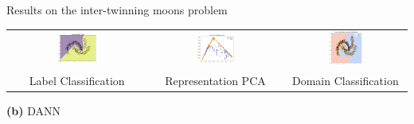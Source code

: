 \documentclass{beamer}
\begin{document}
\begin{frame}{Results on the inter-twinning moons problem}
\begin{minipage}{0.8\linewidth}
\centering
\begin{adjustbox}{max width=\textwidth}
\begin{tabular}{ccc}
\includegraphics[width=0.3\textwidth]{label_decision_dann.png} &
\includegraphics[width=0.3\textwidth]{feature_dann.png} &
\includegraphics[width=0.3\textwidth]{domain_decision_dann.png} \\
\small Label Classification & \small Representation PCA & \small Domain Classification
\end{tabular}
\end{adjustbox}
\end{minipage}

\vspace{0.3cm}
\centering
\small\textbf{(b)} DANN

\end{frame}


\end{document}

